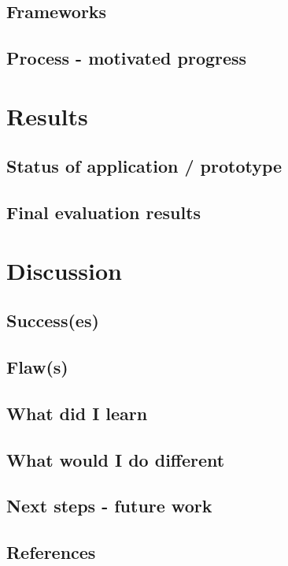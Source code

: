 \documentclass[]{report}
\begin{document}
\section{Frameworks}

\section{Process - motivated progress}

\chapter{Results}

\section{Status of application / prototype}

\section{Final evaluation results}

\chapter{Discussion}

\section{Success(es)}

\section{Flaw(s)}

\section{What did I learn}

\section{What would I do different}

\section{Next steps - future work}

\section{References}
\end{document}
